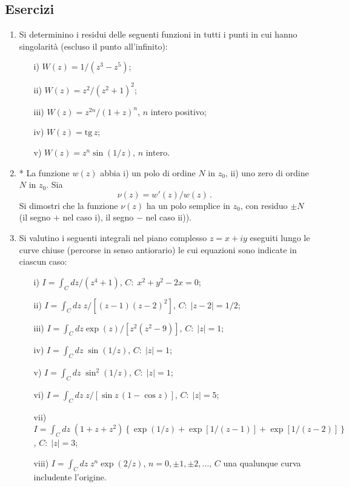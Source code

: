 \documentclass[11pt, a4paper]{book}
\numberwithin{equation}{section}
\newenvironment{esercizi}{\subsection*{Esercizi}\begin{enumerate}}{\end{enumerate}}
\begin{document}
\begin{esercizi}
\item Si determinino i residui delle seguenti funzioni in tutti i punti in cui hanno singolarità (escluso il punto all'infinito):
\begin{enumerate}
\item[i)] $W(z) = 1/(z^3 - z^5)$;
\item[ii)] $W(z) = z^2/(z^2+1)^2$;
\item[iii)] $W(z) = z^{2n}/(1+z)^n$, \quad $n$ intero positivo;
\item[iv)] $W(z) = \mathrm{tg}\,z$;
\item[v)] $W(z) = z^n \sin(1/z)$, \quad $n$ intero.
\end{enumerate}

\item[*] La funzione $w(z)$ abbia i) un polo di ordine $N$ in $z_0$, ii) uno zero di ordine $N$ in $z_0$. Sia
\[
\nu(z) = w'(z)/w(z)\,.
\]
Si dimostri che la funzione $\nu(z)$ ha un polo semplice in $z_0$, con residuo $\pm N$ (il segno $+$ nel caso i), il segno $-$ nel caso ii)).

\item Si valutino i seguenti integrali nel piano complesso $z = x + iy$ eseguiti lungo le curve chiuse (percorse in senso antiorario) le cui equazioni sono indicate in ciascun caso:
\begin{enumerate}
\item[i)] $I = \int_C dz/(z^4+1)$, \quad $C:\; x^2+y^2-2x=0$;
\item[ii)] $I = \int_C dz\; z/[(z-1)(z-2)^2]$, \quad $C:\; |z-2|=1/2$;
\item[iii)] $I = \int_C dz\exp(z)/[z^2(z^2-9)]$, \quad $C:\; |z|=1$;
\item[iv)] $I = \int_C dz\;\sin(1/z)$, \quad $C:\; |z|=1$;
\item[v)] $I = \int_C dz\;\sin^2(1/z)$, \quad $C:\; |z|=1$;
\item[vi)] $I = \int_C dz\; z/[\sin z\,(1-\cos z)]$, \quad $C:\; |z|=5$;
\item[vii)] $I = \int_C dz\;(1+z+z^2)\left\{\exp(1/z) + \exp[1/(z-1)] + \exp[1/(z-2)]\right\}$, \quad $C:\; |z|=3$;
\item[viii)] $I = \int_C dz\; z^n \exp(2/z)$, \quad $n=0,\pm 1,\pm 2,\ldots$, \quad $C$ una qualunque curva includente l'origine.
\end{enumerate}


\end{esercizi}
\end{document}
